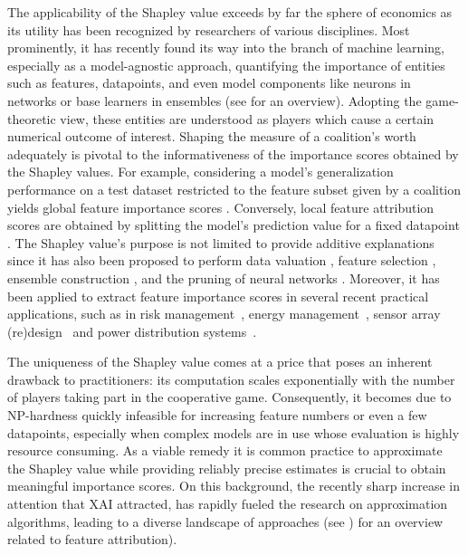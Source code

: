 The applicability of the Shapley value exceeds by far the sphere of economics as its utility has been recognized by researchers of various disciplines.
Most prominently, it has recently found its way into the branch of machine learning, especially as a model-agnostic approach, quantifying the importance of entities such as features, datapoints, and even model components like neurons in networks or base learners in ensembles (see \citep{Rozemberczki.2022} for an overview).
Adopting the game-theoretic view, these entities are understood as players which cause a certain numerical outcome of interest.
Shaping the measure of a coalition's worth adequately is pivotal to the informativeness of the importance scores obtained by the Shapley values.
For example, considering a model's generalization performance on a test dataset
restricted to the feature subset given by a coalition yields global feature importance scores \citep{Pfannschmidt.2016, Covert.2020}.
Conversely, local feature attribution scores are obtained by splitting the model's prediction value for a fixed datapoint \citep{Lundberg.2017}.
The Shapley value's purpose is not limited to provide additive explanations since it has also been proposed to perform data valuation \citep{Ghorbani.2019}, feature selection \citep{Cohen.2007}, ensemble construction \citep{Rozemberczki.2021}, and the pruning of neural networks \citep{Ghorbani.2020}.
Moreover, it has been applied to extract feature importance scores in several recent practical applications, such as in risk management~\citep{Nimmy2023}, energy management~\citep{Cai2023}, sensor array (re)design~\citep{Pelegrina2023b} and power distribution systems~\citep{Ebrahimi2024}.

The uniqueness of the Shapley value comes at a price that poses an inherent drawback to practitioners: its computation scales exponentially with the number of players taking part in the cooperative game.
Consequently, it becomes due to NP-hardness \cite{Deng.1994} quickly infeasible for increasing feature numbers or even a few datapoints, especially when complex models are in use whose evaluation is highly resource consuming.
As a viable remedy it is common practice to approximate the Shapley value while providing reliably precise estimates is crucial to obtain meaningful importance scores.
On this background, the recently sharp increase in attention that XAI attracted, has rapidly fueled the research on approximation algorithms, leading to a diverse landscape of approaches (see \citep{Chen.2023}) for an overview related to feature attribution).


